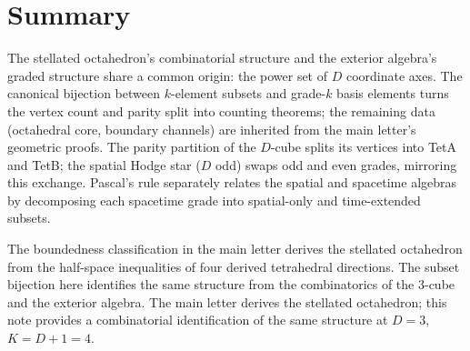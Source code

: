 \documentclass[twocolumn]{iopjournal}
\begin{document}

\section*{Summary}

The stellated octahedron's combinatorial structure and the exterior algebra's graded structure share a common origin: the power set of $D$ coordinate axes. The canonical bijection between $k$-element subsets and grade-$k$ basis elements turns the vertex count and parity split into counting theorems; the remaining data (octahedral core, boundary channels) are inherited from the main letter's geometric proofs. The parity partition of the $D$-cube splits its vertices into TetA and TetB; the spatial Hodge star ($D$ odd) swaps odd and even grades, mirroring this exchange. Pascal's rule separately relates the spatial and spacetime algebras by decomposing each spacetime grade into spatial-only and time-extended subsets.

The boundedness classification in the main letter derives the stellated octahedron from the half-space inequalities of four derived tetrahedral directions. The subset bijection here identifies the same structure from the combinatorics of the 3-cube and the exterior algebra. The main letter derives the stellated octahedron; this note provides a combinatorial identification of the same structure at $D = 3$, $K = D + 1 = 4$.
\end{document}
